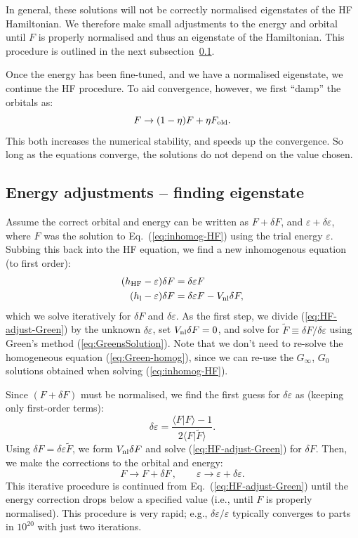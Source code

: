\documentclass[10pt,twocolumn,a4paper]{article}%
\newcommand{\braket}[1]{\ensuremath{\langle #1\rangle}}	%
\newcommand{\be}{\begin{equation}}
\newcommand{\ee}{\end{equation}}
\def\en{\ensuremath{\varepsilon}}
\begin{document}
In general, these solutions will not be correctly normalised eigenstates of the HF Hamiltonian.
We therefore make small adjustments to the energy and orbital until $F$ is properly normalised and thus an eigenstate of the Hamiltonian. 
This procedure is outlined in the next subsection~\ref{sec:hf-adjustEn}.

Once the energy has been fine-tuned, and we have a normalised eigenstate, we continue the HF procedure.
To aid convergence, however, we first ``damp'' the orbitals as:
\be
F \to (1-\eta)F+ \eta F_{\rm old}.
\ee
This both increases the numerical stability, and speeds up the convergence. 
So long as the equations converge, the solutions do not depend on the value chosen.



\subsection{Energy adjustments -- finding eigenstate}\label{sec:hf-adjustEn}




Assume the correct orbital and energy can be written as
$F +  \delta F$, and
$\en + \delta\en $,
where $F$ was the solution to Eq.~(\ref{eq:inhomog-HF}) using the trial energy $\en$.
Subbing this back into the HF equation, we find a new inhomogenous equation (to first order):
\begin{align}
(h_{\rm HF} - \en) \delta F &=  \delta\en F  \\
(h_{\rm l} - \en) \delta F &=  \delta\en F  - V_{\rm nl} \delta F,  \label{eq:HF-adjust-Green}
\end{align}
which we solve iteratively for $\delta F$ and $\delta \en$.
As the first step, we divide (\ref{eq:HF-adjust-Green}) by the unknown $\delta\en$, set $V_{\rm nl} \delta F=0$, and solve for $\tilde F\equiv\delta F/\delta\en$ using Green's method (\ref{eq:GreensSolution}).
Note that we don't need to re-solve the homogeneous equation (\ref{eq:Green-homog}), since we can re-use the $G_\infty$, $G_0$
solutions obtained when solving (\ref{eq:inhomog-HF}).

Since $(F+\delta F)$ must be normalised, we find the first guess for $\delta \en$ as (keeping only first-order terms):
\be
\delta \en = \frac{\braket{F|F} - 1}{2\braket{F|\tilde F}}.
\ee
Using  $\delta F = \delta\en\tilde F$, we form $V_{\rm nl} \delta F$ and solve (\ref{eq:HF-adjust-Green}) for $\delta F$.
Then, we make the corrections to the orbital and energy:
\be
F\to F+\delta F \, , \qquad \en\to\en + \delta\en.
\ee
This iterative procedure is continued from Eq.~(\ref{eq:HF-adjust-Green}) until the energy correction drops below a specified value
(i.e., until $F$ is properly normalised).
This procedure is very rapid; e.g., $\delta\en/\en$ typically converges to parts in $10^{20}$ with just two iterations.
\end{document}
